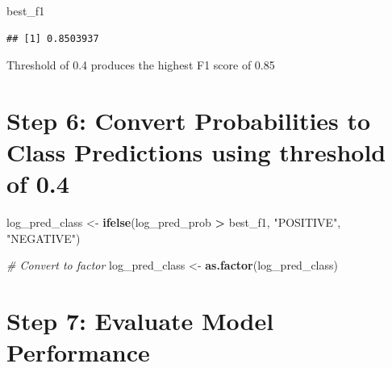 \documentclass[
]{article}
\newenvironment{Shaded}{\begin{snugshade}}{\end{snugshade}}
\newcommand{\CommentTok}[1]{\textcolor[rgb]{0.56,0.35,0.01}{\textit{#1}}}
\newcommand{\FunctionTok}[1]{\textcolor[rgb]{0.13,0.29,0.53}{\textbf{#1}}}
\newcommand{\NormalTok}[1]{#1}
\newcommand{\OtherTok}[1]{\textcolor[rgb]{0.56,0.35,0.01}{#1}}
\newcommand{\SpecialCharTok}[1]{\textcolor[rgb]{0.81,0.36,0.00}{\textbf{#1}}}
\newcommand{\StringTok}[1]{\textcolor[rgb]{0.31,0.60,0.02}{#1}}
\begin{document}
\begin{Shaded}
\begin{Highlighting}[]
\NormalTok{best\_f1}
\end{Highlighting}
\end{Shaded}

\begin{verbatim}
## [1] 0.8503937
\end{verbatim}

Threshold of 0.4 produces the highest F1 score of 0.85

\section{Step 6: Convert Probabilities to Class Predictions using
threshold of
0.4}\label{step-6-convert-probabilities-to-class-predictions-using-threshold-of-0.4}

\begin{Shaded}
\begin{Highlighting}[]
\NormalTok{log\_pred\_class }\OtherTok{\textless{}{-}} \FunctionTok{ifelse}\NormalTok{(log\_pred\_prob }\SpecialCharTok{\textgreater{}}\NormalTok{ best\_f1, }\StringTok{"POSITIVE"}\NormalTok{, }\StringTok{"NEGATIVE"}\NormalTok{)}

\CommentTok{\# Convert to factor}
\NormalTok{log\_pred\_class }\OtherTok{\textless{}{-}} \FunctionTok{as.factor}\NormalTok{(log\_pred\_class)}
\end{Highlighting}
\end{Shaded}

\section{Step 7: Evaluate Model
Performance}\label{step-7-evaluate-model-performance}

\begin{Shaded}
\end{Shaded}
\end{document}
